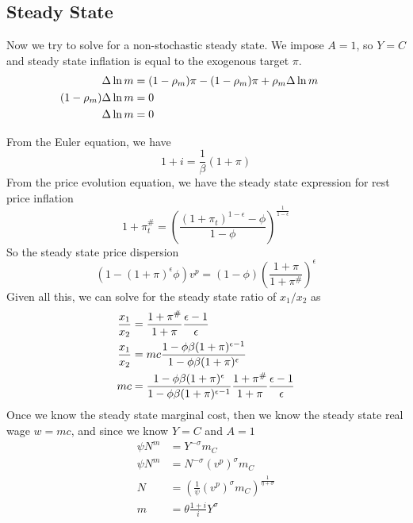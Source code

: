 \documentclass[twocolumn, fleqn]{article}
\begin{document}
	\subsection{Steady State}
	Now we try to solve for a non-stochastic steady state. We impose $A=1$, so $Y=C$ and steady state inflation is equal to the exogenous target $\pi$.
	\begin{align*}
    \hspace{-30pt} \Delta \ln m &= (1 - \rho_m) \pi - (1 - \rho_m) \pi + \rho_m \Delta \ln m \\
    \hspace{-30pt} (1 - \rho_m) \Delta \ln m &= 0 \\
    \hspace{-30pt} \Delta \ln m &= 0
	\end{align*}
	
	From the Euler equation, we have
	\[1+i =\frac{1}{\beta}(1+\pi)\]
	From the price evolution equation, we have the steady state expression for rest price inflation
	\[1 + \pi_t^{\#} = \left( \frac{(1 + \pi_t)^{1-\epsilon} - \phi}{1 - \phi} \right)^{\frac{1}{1-\epsilon}}\]
	So the steady state price dispersion
	\[ (1-(1+\pi)^{\epsilon} \phi)v^p = (1-\phi) \left( \frac{1+\pi}{1+\pi^\#}\right)^{\epsilon}\]
	Given all this, we can solve for the steady state ratio of $x_1/x_2$ as
	\begin{align}
    	\frac{x_1}{x_2} &= \frac{1 + \pi^{\#}}{1 + \pi} \frac{\epsilon - 1}{\epsilon} \notag\\
    	\frac{x_1}{x_2} &= mc \frac{1 - \phi \beta (1 + \pi)^{\epsilon-1}}{1 - \phi \beta (1 + \pi)^{\epsilon}} \notag \\
    	mc &= \frac{1 - \phi \beta (1 + \pi)^{\epsilon}}{1 - \phi \beta (1 + \pi)^{\epsilon-1}} \frac{1 + \pi^{\#}}{1 + \pi} \frac{\epsilon - 1}{\epsilon}
	\end{align}
	Once we know the steady state marginal cost, then we know the steady state real wage $w= mc$, and since we know $Y=C$ and $A=1$
	\begin{align*}
    	\psi N^m &= Y^{-\sigma} m_C \\
    	\psi N^m &= N^{-\sigma} (v^p)^{\sigma} m_C \\
    	N &= \left( \frac{1}{\psi} (v^p)^{\sigma} m_C \right)^{\frac{1}{\eta + \sigma}} \\
    	m &= \theta \frac{1 + i}{i} Y^{\sigma}
	\end{align*}
	
\end{document}
